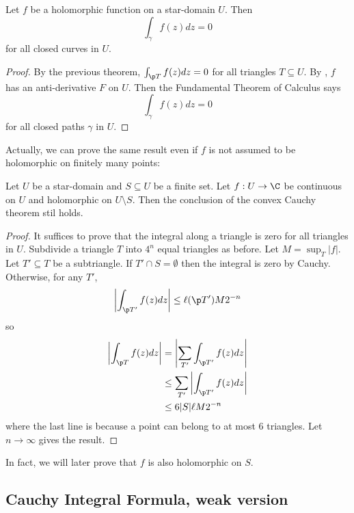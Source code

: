 \documentclass[a4paper]{article}
\begin{document}
\begin{corollary}
  Let \(f\) be a holomorphic function on a star-domain \(U\). Then
  \[
    \int_\gamma f(z)dz = 0
  \]
  for all closed curves in \(U\).
\end{corollary}

\begin{proof}
  By the previous theorem, \(\int_{\p T} f(z)dz = 0\) for all triangles \(T \subseteq U\). By , \(f\) has an anti-derivative \(F\) on \(U\). Then the Fundamental Theorem of Calculus says
  \[
    \int_\gamma f(z)dz = 0
  \]
  for all closed paths \(\gamma\) in \(U\).
\end{proof}

Actually, we can prove the same result even if \(f\) is not assumed to be holomorphic on finitely many points:

\begin{proposition}
  \label{prop:Cauchy with holes}
  Let \(U\) be a star-domain and \(S \subseteq U\) be a finite set. Let \(f: U \to \C\) be continuous on \(U\) and holomorphic on \(U \setminus S\). Then the conclusion of the convex Cauchy theorem stil holds.
\end{proposition}

\begin{proof}
  It suffices to prove that the integral along a triangle is zero for all triangles in \(U\). Subdivide a triangle \(T\) into \(4^n\) equal triangles as before. Let \(M = \sup_T |f|\). Let \(T' \subseteq T\) be a subtriangle. If \(T' \cap S = \emptyset\) then the integral is zero by Cauchy. Otherwise, for any \(T'\),
  \[
    \left| \int_{\p T'} f(z)dz \right| \leq \ell(\p T') M 2^{-n} 
  \]
  so
  \begin{align*}
    \left| \int_{\p T} f(z)dz \right|
    &= \left|\sum_{T'} \int_{\p T'} f(z) dz \right| \\
    &\leq \sum_{T'}\left| \int_{\p T'} f(z)dz \right| \\
    &\leq 6|S|\ell M 2^{-n}
  \end{align*}
  where the last line is because a point can belong to at most \(6\) triangles. Let \(n \to \infty\) gives the result.
\end{proof}

In fact, we will later prove that \(f\) is also holomorphic on \(S\).

\subsection{Cauchy Integral Formula, weak version}
\end{document}
